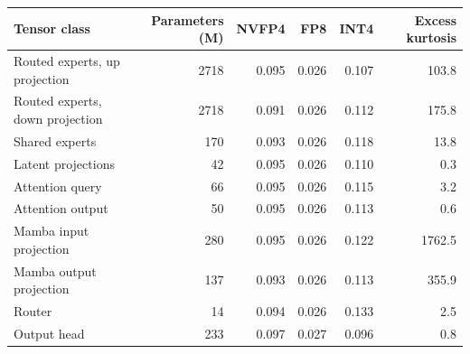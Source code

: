 \begin{tabular}{@{}lrrrrr@{}}
\toprule
Tensor class & Parameters (M) & NVFP4 & FP8 & INT4 & Excess kurtosis \\
\midrule
Routed experts, up projection & 2718 & 0.095 & 0.026 & 0.107 & 103.8 \\
Routed experts, down projection & 2718 & 0.091 & 0.026 & 0.112 & 175.8 \\
Shared experts & 170 & 0.093 & 0.026 & 0.118 & 13.8 \\
Latent projections & 42 & 0.095 & 0.026 & 0.110 & 0.3 \\
Attention query & 66 & 0.095 & 0.026 & 0.115 & 3.2 \\
Attention output & 50 & 0.095 & 0.026 & 0.113 & 0.6 \\
Mamba input projection & 280 & 0.095 & 0.026 & 0.122 & 1762.5 \\
Mamba output projection & 137 & 0.093 & 0.026 & 0.113 & 355.9 \\
Router & 14 & 0.094 & 0.026 & 0.133 & 2.5 \\
Output head & 233 & 0.097 & 0.027 & 0.096 & 0.8 \\
\bottomrule
\end{tabular}
